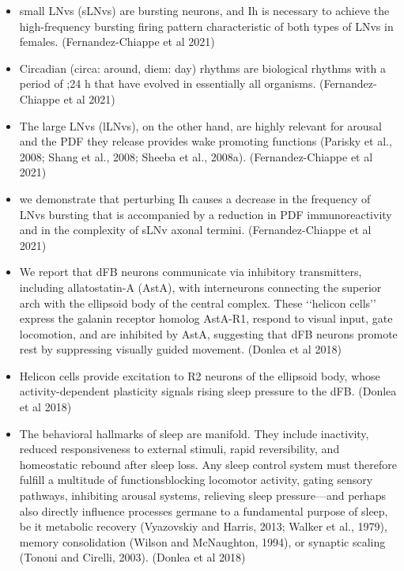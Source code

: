 \documentclass[11pt]{article}
\begin{document}
\begin{itemize}
    \item small LNvs (sLNvs) are bursting neurons, and Ih is necessary to achieve the high-frequency bursting firing pattern
    characteristic of both types of LNvs in females.
    \parencite{fernandez-chiappeHighFrequencyNeuronalBursting2021} (Fernandez-Chiappe et al 2021)

    \item Circadian (circa: around, diem: day) rhythms are biological rhythms with a period of ;24 h that have evolved in essentially all organisms.
    \parencite{fernandez-chiappeHighFrequencyNeuronalBursting2021} (Fernandez-Chiappe et al 2021)

    \item The large LNvs (lLNvs), on the other hand, are highly relevant for arousal and the PDF they release provides wake promoting functions (Parisky et al., 2008; Shang et al., 2008; Sheeba et al., 2008a).
    \parencite{fernandez-chiappeHighFrequencyNeuronalBursting2021} (Fernandez-Chiappe et al 2021)

    \item we demonstrate that perturbing Ih causes a decrease in the frequency of LNvs bursting that is accompanied by a reduction in PDF immunoreactivity and in the complexity of sLNv axonal termini.
    \parencite{fernandez-chiappeHighFrequencyNeuronalBursting2021} (Fernandez-Chiappe et al 2021)

    \item We report that dFB neurons communicate via inhibitory transmitters, including allatostatin-A (AstA), with interneurons connecting the superior arch with the ellipsoid body of the central complex. These ‘‘helicon cells’’ express the galanin receptor homolog AstA-R1, respond to visual input, gate locomotion, and are inhibited by AstA, suggesting that dFB neurons promote rest by suppressing visually guided movement.
    \parencite{donleaRecurrentCircuitryBalancing2018} (Donlea et al 2018)

    \item Helicon cells provide excitation to R2 neurons of the ellipsoid body, whose activity-dependent plasticity signals rising sleep pressure to the dFB.
    \parencite{donleaRecurrentCircuitryBalancing2018} (Donlea et al 2018)

    \item The behavioral hallmarks of sleep are manifold. They include inactivity, reduced responsiveness to external stimuli, rapid reversibility, and homeostatic rebound after sleep loss. Any sleep control system must therefore fulfill a multitude of functionsblocking locomotor activity, gating sensory pathways, inhibiting arousal systems, relieving sleep pressure—and perhaps also directly influence processes germane to a fundamental purpose of sleep, be it metabolic recovery (Vyazovskiy and Harris, 2013; Walker et al., 1979), memory consolidation (Wilson and McNaughton, 1994), or synaptic scaling (Tononi and Cirelli, 2003).
    \parencite{donleaRecurrentCircuitryBalancing2018} (Donlea et al 2018)


\end{itemize}
\end{document}
